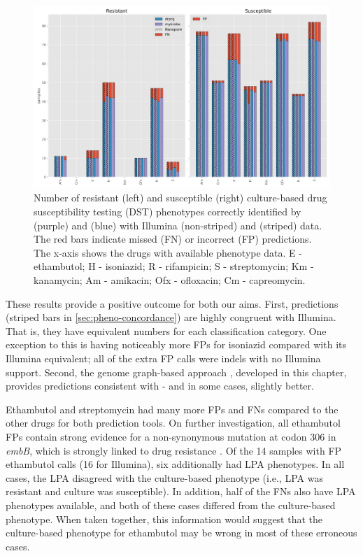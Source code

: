 \begin{figure}
\begin{center}
\includegraphics[width=0.90\columnwidth]{Chapter3/Figs/pheno_concordance_plot.png}
\caption{{Number of resistant (left) and susceptible (right) culture-based drug susceptibility testing (DST) phenotypes correctly identified by \mykrobe{} (purple) and \drprg{} (blue) with Illumina (non-striped) and \ont{} (striped) data. The red bars indicate missed (FN) or incorrect (FP) predictions. The x-axis shows the drugs with available phenotype data. E - ethambutol; H - isoniazid; R - rifampicin; S - streptomycin; Km - kanamycin; Am - amikacin; Ofx - ofloxacin; Cm - capreomycin.
{\label{fig:pheno-concordance}}
}}
\end{center}
\end{figure}

These results provide a positive outcome for both our aims. First, \ont{} predictions (striped bars in \autoref{sec:pheno-concordance}) are highly congruent with Illumina. That is, they have equivalent numbers for each classification category. One exception to this is \mykrobe{} \ont{} having noticeably more FPs for isoniazid compared with its Illumina equivalent; all of the extra \ont{} FP calls were indels with no Illumina support. Second, the genome graph-based approach \drprg{}, developed in this chapter, provides predictions consistent with \mykrobe{} - and in some cases, slightly better. 

Ethambutol and streptomycin had many more FPs and FNs compared to the other drugs for both prediction tools. On further investigation, all ethambutol FPs contain strong evidence for a non-synonymous mutation at codon 306 in \textit{embB}, which is strongly linked to drug resistance \cite{Maningi2017,Srivastava2009,Brossier2015}. Of the 14 samples with FP ethambutol calls (16 for \mykrobe{} Illumina), six additionally had LPA phenotypes. In all cases, the LPA disagreed with the culture-based phenotype (i.e., LPA was resistant and culture was susceptible). In addition, half of the FNs also have LPA phenotypes available, and both of these cases differed from the culture-based phenotype. When taken together, this information would suggest that the culture-based phenotype for ethambutol may be wrong in most of these erroneous cases.

